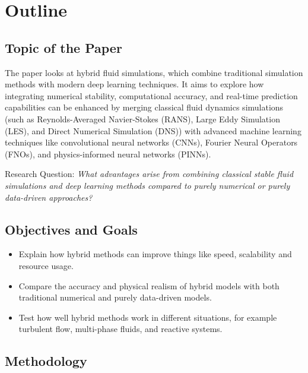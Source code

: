 \section{Outline}\label{sec:Outline}
\subsection*{Topic of the Paper}
The paper looks at hybrid fluid simulations, which combine 
traditional simulation methods with modern deep learning techniques. 
It aims to 
explore how integrating numerical stability, computational accuracy, and real-time 
prediction capabilities can be enhanced by merging classical fluid dynamics 
simulations (such as Reynolds-Averaged Navier-Stokes (RANS), Large Eddy Simulation 
(LES), and Direct Numerical Simulation (DNS)) with advanced machine learning 
techniques like convolutional neural networks (CNNs), Fourier Neural Operators 
(FNOs), and physics-informed neural networks (PINNs).

Research Question:
\textit{What advantages arise from combining classical stable fluid simulations and deep 
learning methods compared to purely numerical or purely data-driven approaches?}

\subsection*{Objectives and Goals}
\begin{itemize}
    \item 
	Explain how hybrid methods can improve things like speed, 
    scalability and resource usage.

    \item 
    Compare the accuracy and physical realism of hybrid models with both 
    traditional numerical and purely data-driven models.

    \item 
	Test how well hybrid methods work in different situations, 
    for example turbulent flow, multi-phase fluids, and reactive systems.

\end{itemize}

\subsection*{Methodology}
